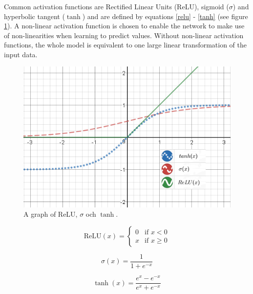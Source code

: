 \documentclass[a4paper, twoside]{article}
\begin{document}
Common activation functions are Rectified Linear Units (ReLU), sigmoid ($\sigma$) and hyperbolic tangent ($\tanh$) and are defined by equations \eqref{relu} - \eqref{tanh} (see figure \ref{activation_function}). A non-linear activation function is chosen to enable the network to make use of non-linearities when learning to predict values. Without non-linear activation functions, the whole model is equivalent to one large linear transformation of the input data. \cite{cs231n}
\\
\begin{figure}[h]
	\centering
  		\includegraphics[scale=0.73]{activationfunction.png}
  	\caption{A graph of ReLU, $\sigma$ och $\tanh$.} \label{activation_function}
\end{figure}

\begin{equation}\label{relu}
\mbox{ReLU}{(x)} = \begin{cases} 
			0 & \mbox{if } x < 0 \\ 
			x & \mbox{if } x \geq 0 
		\end{cases}
\end{equation}

\begin{equation}\label{sigmoid}
\sigma(x) = \frac{1}{1+e^{-x}}
\end{equation}

\begin{equation}\label{tanh}
\tanh{(x)} = \frac{e^x-e^{-x}}{e^x+e^{-x}}
\end{equation}
\end{document}
